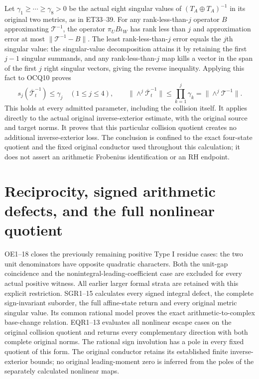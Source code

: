 \documentclass[11pt]{article}
\begin{document}
Let $\gamma_1\ge\cdots\ge\gamma_8>0$ be the actual eight singular
values of $(T_A\oplus T_A)^{-1}$ in its original two metrics, as in
ET33--39. For any rank-less-than-$j$ operator $B$ approximating
$\mathcal T^{-1}$, the operator $\pi_U B\iota_W$ has rank less than
$j$ and approximation error at most $\|\mathcal T^{-1}-B\|$.
The least rank-less-than-$j$ error equals the $j$th singular value:
the singular-value decomposition attains it by retaining the first
$j-1$ singular summands, and any rank-less-than-$j$ map kills a vector
in the span of the first $j$ right singular vectors, giving the reverse
inequality. Applying this fact to OCQ10 proves
\[
 s_j(\overline{\mathcal T}_t^{-1})\le\gamma_j\quad(1\le j\le4),
 \qquad
 \boxed{\|\wedge^j\overline{\mathcal T}_t^{-1}\|
       \le\prod_{k=1}^j\gamma_k
       =\|\wedge^j\mathcal T^{-1}\|.}
 \tag{OCQ11}
\]
This holds at every admitted parameter, including the collision itself.
It applies directly to the actual original inverse-exterior estimate,
with the original source and target norms. It proves that this
particular collision quotient creates no additional inverse-exterior
loss. The conclusion is confined to the exact four-state quotient
and the fixed original conductor used throughout this calculation;
it does not assert an arithmetic Frobenius identification or an RH
endpoint.


\section{Reciprocity, signed arithmetic defects, and the full nonlinear quotient}
OE1--18 closes the previously remaining positive Type I residue cases:
the two unit denominators have opposite quadratic characters. Both
the unit-gap coincidence and the nonintegral-leading-coefficient case
are excluded for every actual positive witness. All earlier larger
formal strata are retained with this explicit restriction.
SGR1--15 calculates every signed integral defect, the complete
sign-invariant suborder, the full affine-state return and every original
metric singular value. Its common rational model proves the exact
arithmetic-to-complex base-change relation. EQR1--13 evaluates all
nonlinear escape cases on the original collision quotient and returns
every complementary direction with both complete original norms.
The rational sign involution has a pole in every fixed quotient of
this form. The original conductor retains its established finite
inverse-exterior bounds; no original leading-moment zero is inferred
from the poles of the separately calculated nonlinear maps.
\end{document}
